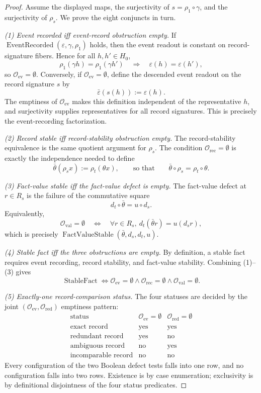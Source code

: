 \documentclass[11pt]{article}
\theoremstyle{definition}
\begin{document}
\begin{proof}
Assume the displayed maps, the surjectivity of \(s=\rho_1\circ\gamma\),
and the surjectivity of \(\rho_s\).  We prove the eight conjuncts in
turn.

\emph{(1) Event recorded iff event-record obstruction empty.}
If \(\operatorname{EventRecorded}(\varepsilon,\gamma,\rho_1)\) holds,
then the event readout is constant on record-signature fibers.  Hence
for all \(h,h'\in H_0\),
\[
  \rho_1(\gamma h)=\rho_1(\gamma h')
  \quad\Longrightarrow\quad
  \varepsilon(h)=\varepsilon(h'),
\]
so \(\mathcal O_{\mathrm{ev}}=\emptyset\).  Conversely, if
\(\mathcal O_{\mathrm{ev}}=\emptyset\), define the descended event
readout on the record signature \(s\) by
\[
  \bar\varepsilon(s(h)):=\varepsilon(h).
\]
The emptiness of \(\mathcal O_{\mathrm{ev}}\) makes this definition
independent of the representative \(h\), and surjectivity supplies
representatives for all record signatures.  This is precisely the
event-recording factorization.

\emph{(2) Record stable iff record-stability obstruction empty.}
The record-stability equivalence is the same quotient argument for
\(\rho_s\).  The condition \(\mathcal O_{\mathrm{rec}}=\emptyset\) is
exactly the independence needed to define
\[
  \bar\theta(\rho_s x):=\rho_t(\theta x),
  \qquad\text{so that}\qquad
  \bar\theta\circ\rho_s=\rho_t\circ\theta.
\]

\emph{(3) Fact-value stable iff the fact-value defect is empty.}
The fact-value defect at \(r\in R_s\) is the failure of the
commutative square
\[
  d_t\circ\bar\theta=u\circ d_s.
\]
Equivalently,
\[
  \mathcal O_{\mathrm{val}}=\emptyset
  \quad\Longleftrightarrow\quad
  \forall r\in R_s,\ d_t(\bar\theta r)=u(d_s r),
\]
which is precisely \(\operatorname{FactValueStable}(\bar\theta,d_s,d_t,u)\).

\emph{(4) Stable fact iff the three obstructions are empty.}
By definition, a stable fact requires event recording, record
stability, and fact-value stability.  Combining (1)--(3) gives
\[
  \operatorname{StableFact}
  \iff
  \mathcal O_{\mathrm{ev}}=\emptyset
  \wedge
  \mathcal O_{\mathrm{rec}}=\emptyset
  \wedge
  \mathcal O_{\mathrm{val}}=\emptyset.
\]

\emph{(5) Exactly-one record-comparison status.}
The four statuses are decided by the joint
\((\mathcal O_{\mathrm{ev}},\mathcal O_{\mathrm{red}})\) emptiness
pattern:
\[
\begin{array}{c|c|c}
\text{status} & \mathcal O_{\mathrm{ev}}=\emptyset
  & \mathcal O_{\mathrm{red}}=\emptyset\\
\hline
\text{exact record} & \text{yes} & \text{yes}\\
\text{redundant record} & \text{yes} & \text{no}\\
\text{ambiguous record} & \text{no} & \text{yes}\\
\text{incomparable record} & \text{no} & \text{no}
\end{array}
\]
Every configuration of the two Boolean defect tests falls into one
row, and no configuration falls into two rows.  Existence is by case
enumeration; exclusivity is by definitional disjointness of the four
status predicates.


\end{proof}
\end{document}
